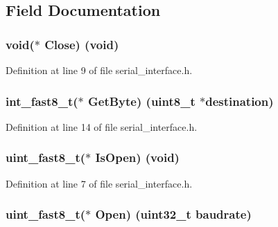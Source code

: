 \subsection{Field Documentation}
\subsubsection[{\texorpdfstring{Close}{Close}}]{\setlength{\rightskip}{0pt plus 5cm}void($\ast$ Close) (void)}\hypertarget{struct_serial_interface_afe54572dbd83578a45d1cd4156c0979d}{}\label{struct_serial_interface_afe54572dbd83578a45d1cd4156c0979d}


Definition at line 9 of file serial\+\_\+interface.\+h.

\subsubsection[{\texorpdfstring{Get\+Byte}{GetByte}}]{\setlength{\rightskip}{0pt plus 5cm}int\+\_\+fast8\+\_\+t($\ast$ Get\+Byte) (uint8\+\_\+t $\ast$destination)}\hypertarget{struct_serial_interface_ae3fb059727674674e6bc14ce661fff6d}{}\label{struct_serial_interface_ae3fb059727674674e6bc14ce661fff6d}


Definition at line 14 of file serial\+\_\+interface.\+h.

\subsubsection[{\texorpdfstring{Is\+Open}{IsOpen}}]{\setlength{\rightskip}{0pt plus 5cm}uint\+\_\+fast8\+\_\+t($\ast$ Is\+Open) (void)}\hypertarget{struct_serial_interface_a5e72e5c9ff8f55863484f5a31a044a10}{}\label{struct_serial_interface_a5e72e5c9ff8f55863484f5a31a044a10}


Definition at line 7 of file serial\+\_\+interface.\+h.

\subsubsection[{\texorpdfstring{Open}{Open}}]{\setlength{\rightskip}{0pt plus 5cm}uint\+\_\+fast8\+\_\+t($\ast$ Open) (uint32\+\_\+t baudrate)}\hypertarget{struct_serial_interface_aafb5a65915da9b72df39987f9c20050d}{}\label{struct_serial_interface_aafb5a65915da9b72df39987f9c20050d}


